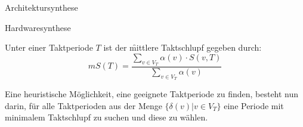 \begin{chapter}{Architektursynthese}
\begin{section}{Hardwaresynthese}
 
 Unter einer Taktperiode $T$ ist der \f{mittlere Taktschlupf} gegeben durch:
 \[ mS(T) = \frac{\sum_{v\in V_T} \alpha(v) \cdot S(v,T)}{\sum_{v\in V_T} \alpha(v)} \]
 
 Eine heuristische Möglichkeit, eine geeignete Taktperiode zu finden, besteht nun darin, für alle Taktperioden aus der Menge $\{ \delta(v) | v\in V_T \}$ eine Periode mit minimalem Taktschlupf zu suchen und diese zu wählen.


 
\end{section}

 
\end{chapter}
